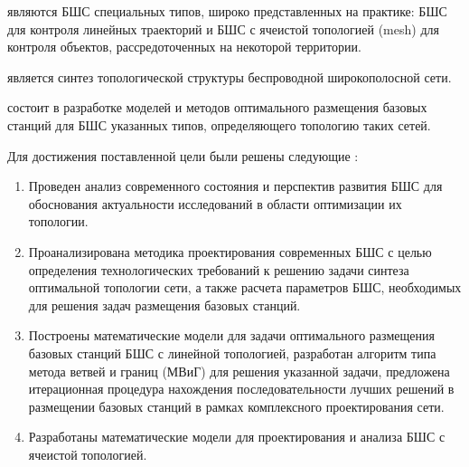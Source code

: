 {\objectresearch} являются БШС специальных типов, широко представленных на практике: БШС для контроля линейных траекторий и БШС с ячеистой топологией (mesh) для контроля объектов, рассредоточенных на некоторой территории.

{\subjectresearch} является синтез топологической структуры беспроводной широкополосной сети.

{\aim} состоит в разработке моделей и методов оптимального размещения базовых станций для БШС указанных типов, определяющего топологию таких сетей.

Для достижения поставленной цели были решены следующие {\tasks}:
\begin{enumerate}[beginpenalty=10000] %
  \item Проведен анализ современного состояния и перспектив развития БШС для  обоснования  актуальности исследований в области оптимизации их топологии. 
  \item Проанализирована методика проектирования современных БШС с целью определения технологических требований к решению задачи синтеза оптимальной топологии сети, а также расчета параметров БШС, необходимых для решения задач размещения базовых станций.
  \item Построены математические модели для задачи оптимального размещения базовых станций БШС с линейной топологией, разработан алгоритм типа метода ветвей и границ (МВиГ) для решения указанной задачи, предложена итерационная процедура нахождения последовательности лучших решений в размещении базовых станций в рамках комплексного проектирования сети.
  \item Разработаны математические модели для проектирования и анализа БШС с ячеистой топологией.

\end{enumerate}




